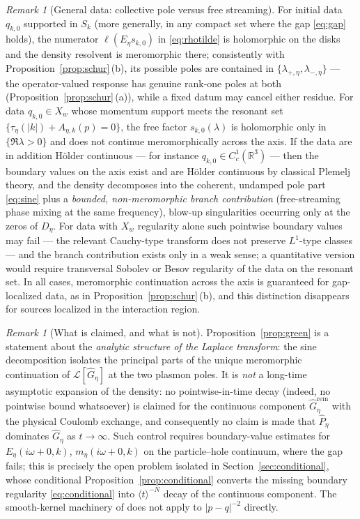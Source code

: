 \documentclass[11pt,a4paper]{amsart}
\theoremstyle{definition}
\theoremstyle{remark}
\newtheorem{remark}[theorem]{Remark}
\newcommand{\R}{\mathbb{R}}
\newcommand{\ellf}{\ell}
\begin{document}
\begin{remark}[General data: collective pole versus free streaming]\label{rem:generaldata}
For initial data $q_{k,0}$ supported in $S_k$ (more generally, in any compact set where the gap \eqref{eq:gap} holds), the numerator $\ellf(E_\eta s_{k,0})$ in \eqref{eq:rhotilde} is holomorphic on the disks and the density resolvent is meromorphic there; consistently with Proposition~\ref{prop:schur}\,(b), its possible poles are contained in $\{\lambda_{+,\eta},\lambda_{-,\eta}\}$ --- the operator-valued response has genuine rank-one poles at both (Proposition~\ref{prop:schur}\,(a)), while a fixed datum may cancel either residue. For data $q_{k,0}\in X_w$ whose momentum support meets the resonant set $\{\tau_\eta(|k|)+A_{\eta,k}(p)=0\}$, the free factor $s_{k,0}(\lambda)$ is holomorphic only in $\{\Re\lambda>0\}$ and does not continue meromorphically across the axis. If the data are in addition H\"older continuous --- for instance $q_{k,0}\in C^1_c(\R^3)$ --- then the boundary values on the axis exist and are H\"older continuous by classical Plemelj theory, and the density decomposes into the coherent, undamped pole part \eqref{eq:sine} plus a \emph{bounded, non-meromorphic branch contribution} (free-streaming phase mixing at the same frequency), blow-up singularities occurring only at the zeros of $D_\eta$. For data with $X_w$ regularity alone such pointwise boundary values may fail --- the relevant Cauchy-type transform does not preserve $L^1$-type classes --- and the branch contribution exists only in a weak sense; a quantitative version would require transversal Sobolev or Besov regularity of the data on the resonant set. In all cases, meromorphic continuation across the axis is guaranteed for gap-localized data, as in Proposition~\ref{prop:schur}\,(b), and this distinction disappears for sources localized in the interaction region.
\end{remark}

\begin{remark}[What is claimed, and what is not]\label{rem:noremdecay}
Proposition~\ref{prop:green} is a statement about the \emph{analytic structure of the Laplace transform}: the sine decomposition isolates the principal parts of the unique meromorphic continuation of $\mathcal L[\widehat G_\eta]$ at the two plasmon poles. It is \emph{not} a long-time asymptotic expansion of the density: no pointwise-in-time decay (indeed, no pointwise bound whatsoever) is claimed for the continuous component $\widehat G^{\mathrm{rem}}_\eta$ with the physical Coulomb exchange, and consequently no claim is made that $\widehat P_\eta$ dominates $\widehat G_\eta$ as $t\to\infty$. Such control requires boundary-value estimates for $E_\eta(i\omega+0,k)$, $m_\eta(i\omega+0,k)$ on the particle--hole continuum, where the gap fails; this is precisely the open problem isolated in Section~\ref{sec:conditional}, whose conditional Proposition~\ref{prop:conditional} converts the missing boundary regularity \eqref{eq:conditional} into $\langle t\rangle^{-N}$ decay of the continuous component. The smooth-kernel machinery of \cite{NY2} does not apply to $|p-q|^{-2}$ directly.
\end{remark}
\end{document}

